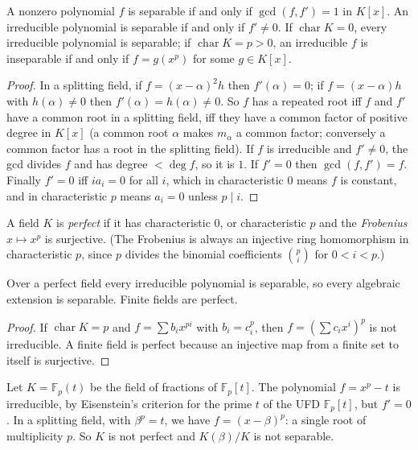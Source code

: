 \begin{proposition}\label{fields:proposition-separable-criterion}
A nonzero polynomial $f$ is separable if and only if $\gcd(f, f') = 1$ in $K[x]$. An
irreducible polynomial is separable if and only if $f' \neq 0$. If $\operatorname{char} K = 0$,
every irreducible polynomial is separable; if $\operatorname{char} K = p > 0$, an irreducible
$f$ is inseparable if and only if $f = g(x^p)$ for some $g \in K[x]$.
\end{proposition}

\begin{proof}
In a splitting field, if $f = (x - \alpha)^2 h$ then $f'(\alpha) = 0$; if $f = (x - \alpha)h$ with
$h(\alpha) \neq 0$ then $f'(\alpha) = h(\alpha) \neq 0$. So $f$ has a repeated root iff $f$ and $f'$ have a
common root in a splitting field, iff they have a common factor of positive degree in
$K[x]$ (a common root $\alpha$ makes $m_\alpha$ a common factor; conversely a common factor has
a root in the splitting field). If $f$ is irreducible and $f' \neq 0$, the gcd divides $f$ and
has degree $< \deg f$, so it is $1$. If $f' = 0$ then $\gcd(f, f') = f$. Finally $f' = 0$ iff
$i a_i = 0$ for all $i$, which in characteristic $0$ means $f$ is constant, and in
characteristic $p$ means $a_i = 0$ unless $p \mid i$.
\end{proof}

\begin{definition}\label{fields:definition-perfect}
A field $K$ is \emph{perfect} if it has characteristic $0$, or characteristic $p$ and the
\emph{Frobenius} $x \mapsto x^p$ is surjective. (The Frobenius is always an injective ring
homomorphism in characteristic $p$, since $p$ divides the binomial coefficients
$\binom{p}{i}$ for $0 < i < p$.)
\end{definition}

\begin{proposition}\label{fields:proposition-perfect}
Over a perfect field every irreducible polynomial is separable, so every algebraic
extension is separable. Finite fields are perfect.
\end{proposition}

\begin{proof}
If $\operatorname{char} K = p$ and $f = \sum b_i x^{pi}$ with $b_i = c_i^p$, then $f = (\sum c_i x^i)^p$
is not irreducible. A finite field is perfect because an injective map from a finite set
to itself is surjective.
\end{proof}

\begin{counterexample}\label{fields:counterexample-inseparable}
Let $K = \mathbb{F}_p(t)$ be the field of fractions of $\mathbb{F}_p[t]$. The polynomial
$f = x^p - t$ is irreducible, by Eisenstein's criterion for the prime $t$ of the UFD
$\mathbb{F}_p[t]$, but $f' = 0$. In a splitting field, with $\beta^p = t$, we have
$f = (x - \beta)^p$: a single root of multiplicity $p$. So $K$ is not perfect and $K(\beta)/K$ is
not separable.
\end{counterexample}

